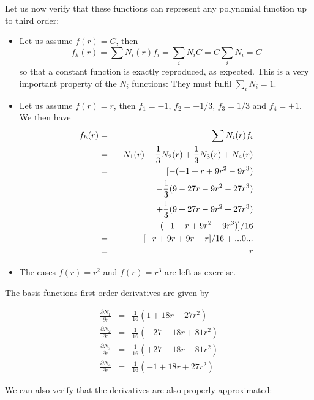 Let us now verify that these functions can represent any polynomial function up to third order:

\begin{itemize}
\item
Let us assume $f(r)=C$, then
\[
f_h(r) = \sum N_i(r) f_i = \sum_i N_i C = C \sum_i N_i  = C
\]
so that a constant function is exactly reproduced, as expected.
This is a very important property of the $N_i$ functions: They must fulfil $\sum\limits_i N_i =1$.

\item
Let us assume $f(r)= r$, then $f_1=-1$, $f_2=-1/3$, $f_3=1/3$ and $f_4=+1$. We then have
\begin{eqnarray}
f_h(r) 
&=& \sum N_i(r) f_i  \nonumber\\
&=& - N_1(r) -\frac{1}{3}N_2(r) + \frac{1}{3}N_3(r)  + N_4(r) \nonumber\\
&=& [-(-1+  r+9r^2- 9r^3 ) \nonumber\\
&&- \frac{1}{3} ( 9-27r-9r^2-27r^3 ) \nonumber\\
&&+ \frac{1}{3} ( 9+27r-9r^2+27r^3 ) \nonumber\\
&&+ (-1-  r+9r^2+ 9r^3 )]/16 \nonumber\\
&=& [-r +9r + 9r -r]/16  + ... 0 ... \nonumber\\
&=& r   
\end{eqnarray}

\item The cases $f(r)=r^2$ and $f(r)=r^3$ are left as exercise.

\end{itemize}

The basis functions first-order derivatives are given by
\begin{mdframed}[backgroundcolor=blue!5]
\begin{eqnarray}
\frac{\partial N_1}{\partial r}&=& \frac{1}{16}  (  1 +18r - 27r^2 ) \nonumber\\ 
\frac{\partial N_2}{\partial r}&=& \frac{1}{16}  (-27 -18r + 81r^2 ) \nonumber\\ 
\frac{\partial N_3}{\partial r}&=& \frac{1}{16}  (+27 -18r - 81r^2 ) \nonumber\\ 
\frac{\partial N_4}{\partial r}&=& \frac{1}{16}  ( -1 +18r + 27r^2 ) \nonumber
\end{eqnarray}
\end{mdframed}

We can also verify that the derivatives are also properly approximated:

